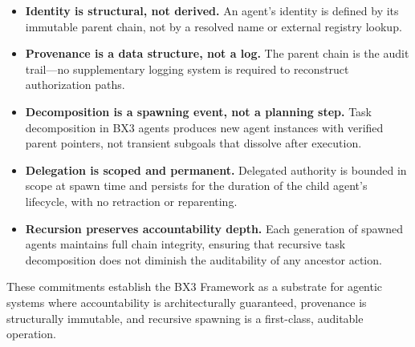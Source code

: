 \begin{itemize}
    \item \textbf{Identity is structural, not derived.} An agent's identity is defined by its immutable parent chain, not by a resolved name or external registry lookup.
    \item \textbf{Provenance is a data structure, not a log.} The parent chain is the audit trail---no supplementary logging system is required to reconstruct authorization paths.
    \item \textbf{Decomposition is a spawning event, not a planning step.} Task decomposition in BX3 agents produces new agent instances with verified parent pointers, not transient subgoals that dissolve after execution.
    \item \textbf{Delegation is scoped and permanent.} Delegated authority is bounded in scope at spawn time and persists for the duration of the child agent's lifecycle, with no retraction or reparenting.
    \item \textbf{Recursion preserves accountability depth.} Each generation of spawned agents maintains full chain integrity, ensuring that recursive task decomposition does not diminish the auditability of any ancestor action.
\end{itemize}

These commitments establish the BX3 Framework as a substrate for agentic systems where accountability is architecturally guaranteed, provenance is structurally immutable, and recursive spawning is a first-class, auditable operation.



